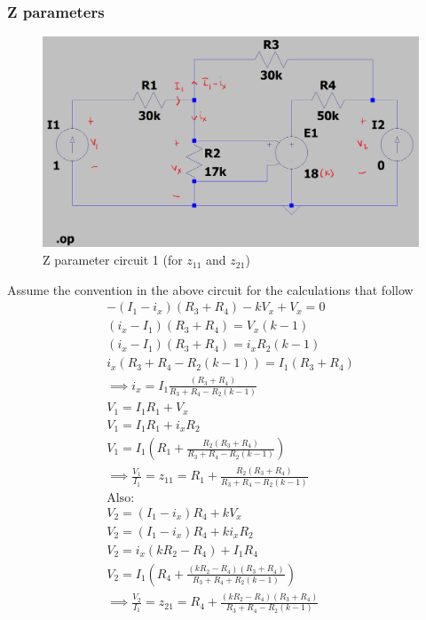 \documentclass{article}[12pt]
\begin{document}
\subsubsection*{Z parameters}
\begin{figure}[ht]
    \centering
    \includegraphics[scale=0.25]{zparams1.png}
    \caption{Z parameter circuit 1 (for $z_{11}$ and $z_{21}$)}
\end{figure}
Assume the convention in the above circuit for the calculations that follow
\begin{gather*}
    -(I_1-i_x)(R_3+R_4)-kV_x+V_x=0\\
    (i_x-I_1)(R_3+R_4)=V_x(k-1)\\
    (i_x-I_1)(R_3+R_4)=i_xR_2(k-1)\\
    i_x(R_3+R_4-R_2(k-1))=I_1(R_3+R_4)\\
    \implies i_x=I_1\frac{(R_3+R_4)}{R_3+R_4-R_2(k-1)} \\
    V_1=I_1R_1+V_x\\
    V_1=I_1R_1+i_xR_2\\
    V_1=I_1\left(R_1+\frac{R_2(R_3+R_4)}{R_3+R_4-R_2(k-1)}\right) \\
    \implies \frac{V_1}{I_1}=\boxed{z_{11} = R_1 + \frac{R_2(R_3+R_4)}{R_3+R_4-R_2(k-1)}} \\
    \mathrm{Also:} \\
    V_2=(I_1-i_x)R_4+kV_x\\
    V_2=(I_1-i_x)R_4+ki_xR_2\\
    V_2=i_x(kR_2-R_4)+I_1R_4\\
    V_2=I_1\left(R_4+\frac{(kR_2-R_4)(R_3+R_4)}{R_3+R_4+R_2(k-1)}\right)\\
    \implies\frac{V_2}{I_1} = \boxed{z_{21} = R_4 + \frac{(kR_2-R_4)(R_3+R_4)}{R_3+R_4-R_2(k-1)}}
\end{gather*}
\newpage
\end{document}
